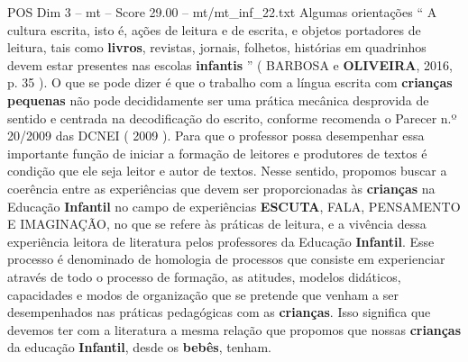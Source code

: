 \begin{textsample}{POS Dim 3 – mt – Score 29.00 – mt/mt\_inf\_22.txt}
Algumas orientações “ A cultura escrita, isto é, ações de leitura e de escrita, e objetos portadores de leitura, tais como \textbf{livros}, revistas, jornais, folhetos, histórias em quadrinhos devem estar presentes nas escolas \textbf{infantis} ” ( BARBOSA e \textbf{OLIVEIRA}, 2016, p. 35 ).
O que se pode dizer é que o trabalho com a língua escrita com \textbf{crianças} \textbf{pequenas} não pode decididamente ser uma prática mecânica desprovida de sentido e centrada na decodificação do escrito, conforme recomenda o Parecer n.º 20/2009 das DCNEI ( 2009 ).
Para que o professor possa desempenhar essa importante função de iniciar a formação de leitores e produtores de textos é condição que ele seja leitor e autor de textos.
Nesse sentido, propomos buscar a coerência entre as experiências que devem ser proporcionadas às \textbf{crianças} na Educação \textbf{Infantil} no campo de experiências \textbf{ESCUTA}, FALA, PENSAMENTO E IMAGINAÇÃO, no que se refere às práticas de leitura, e a vivência dessa experiência leitora de literatura pelos professores da Educação \textbf{Infantil}.
Esse processo é denominado de homologia de processos que consiste em experienciar através de todo o processo de formação, as atitudes, modelos didáticos, capacidades e modos de organização que se pretende que venham a ser desempenhados nas práticas pedagógicas com as \textbf{crianças}.
Isso significa que devemos ter com a literatura a mesma relação que propomos que nossas \textbf{crianças} da educação \textbf{Infantil}, desde os \textbf{bebês}, tenham.

\end{textsample}
